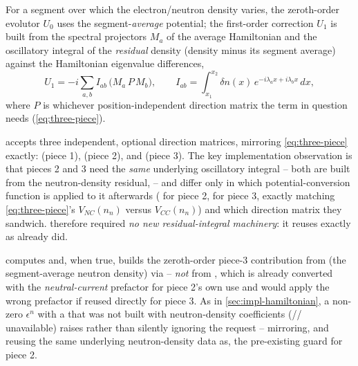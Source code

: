 
\begin{theorybox}
For a segment over which the electron/neutron density varies, the
zeroth-order evolutor $U_0$ uses the segment-\emph{average} potential;
the first-order correction $U_1$ is built from the spectral projectors
$M_a$ of the average Hamiltonian and the oscillatory integral of the
\emph{residual} density (density minus its segment average) against the
Hamiltonian eigenvalue differences,
\begin{equation}
  U_1 = -i\sum_{a,b} I_{ab}\,\bigl(M_a\,P\,M_b\bigr),
  \qquad
  I_{ab} = \int_{x_1}^{x_2}\delta n(x)\,e^{-i\lambda_a x+i\lambda_b x}\,dx,
\end{equation}
where $P$ is whichever position-independent direction matrix the term in
question needs (\cref{eq:three-piece}).
\end{theorybox}

\begin{implbox}
 accepts three independent, optional direction
matrices, mirroring \cref{eq:three-piece} exactly:  (piece 1),
 (piece 2), and  (piece 3). The key implementation
observation is that pieces 2 and 3 need the \emph{same} underlying
oscillatory integral -- both are built from the neutron-density residual,
 -- and differ only
in which potential-conversion function is applied to it afterwards
( for piece 2, 
for piece 3, exactly matching \cref{eq:three-piece}'s $V_{NC}(n_n)$ versus
$V_{CC}(n_n)$) and which direction matrix they sandwich. 
therefore required \emph{no new residual-integral machinery}: it reuses
 exactly as  already did.
\end{implbox}

\begin{implbox}[title={Zeroth-order composition term and the neutron-coupling guard}]
 computes
 and, when true, builds the
zeroth-order piece-3 contribution from 
(the segment-average neutron density) via  --
\emph{not} from , which is already
converted with the \emph{neutral-current} prefactor for piece 2's own use
and would apply the wrong prefactor if reused directly for piece 3. As in
\cref{sec:impl-hamiltonian}, a non-zero $\epsilon^n$ with a
 that was not built with neutron-density coefficients
(//
unavailable) raises  rather than silently ignoring the
request -- mirroring, and reusing the same underlying neutron-density data
as, the pre-existing  guard for piece 2.
\end{implbox}

